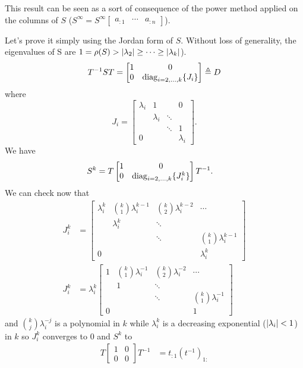 \begin{solution}
	This result can be seen as a sort of consequence of the power method
	applied on the columns of $S$
	($S^\infty = S^\infty
	\begin{bmatrix}
	a_{:1} & \cdots & a_{:n}
	\end{bmatrix}$).
	
	Let's prove it simply using the Jordan form of $S$.
	Without loss of generality, the eigenvalues of S are $1 = \rho(S) > {\left\lvert\lambda_2\right\lvert} \geq \cdots \geq {\left\lvert\lambda_k\right\lvert}$).
	\begin{equation}
	T^{-1}ST =
	\begin{bmatrix}
	1 & 0\\
	0 &
	\operatorname{diag}_{i = 2, \ldots, k}
	\{J_i\}
	\end{bmatrix} \triangleq D \label{D}
	\end{equation}
	where
	\[ J_i =
	\begin{bmatrix}
	\lambda_i & 1 &  & 0\\
	& \lambda_i & \ddots &\\
	& & \ddots & 1\\
	0 & & & \lambda_i
	\end{bmatrix}.
	\]
	We have
	\begin{align*}
	S^k & =
	T
	\begin{bmatrix}
	1 & 0\\
	0 &
	\operatorname{diag}_{i = 2, \ldots, k}
	\{J_i^k\}
	\end{bmatrix}
	T^{-1}.
	\end{align*}
	We can check now that
	\begin{align*}
	J_i^k & =
	\begin{bmatrix}
	\lambda_i^k & \binom{k}{1}\lambda_i^{k-1} & \binom{k}{2}\lambda_i^{k-2} & \cdots\\
	& \lambda_i^k & \ddots & \\
	& & \ddots & \binom{k}{1} \lambda_i^{k-1}\\
	0 & & & \lambda_i^k
	\end{bmatrix}\\
	J_i^k & =
	\lambda_i^k
	\begin{bmatrix}
	1 & \binom{k}{1}\lambda_i^{-1} & \binom{k}{2}\lambda_i^{-2} & \cdots\\
	& 1 & \ddots & \\
	& & \ddots & \binom{k}{1}\lambda_i^{-1}\\
	0 & & & 1
	\end{bmatrix}
	\end{align*}
	and $\binom{k}{j} \lambda_i^{-j}$ is a polynomial in $k$ while $\lambda_i^k$ is a decreasing exponential (${\left\lvert\lambda_i\right\lvert} < 1$) in $k$ so
	$J_i^k$ converges to $0$ and $S^k$ to
	\begin{align}
	T
	\begin{bmatrix}
	1 & 0\\
	0 & 0
	\end{bmatrix}
	T^{-1}
	& =
	t_{:1}(t^{-1})_{1:}
	\end{align}
	

\end{solution}
